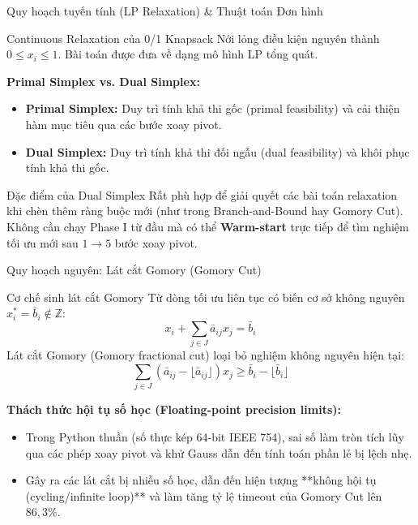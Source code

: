 \documentclass[10pt]{beamer}
\begin{document}
\begin{frame}{Quy hoạch tuyến tính (LP Relaxation) \& Thuật toán Đơn hình}
    \begin{block}{Continuous Relaxation của 0/1 Knapsack}
        Nới lỏng điều kiện nguyên thành $0 \le x_i \le 1$. Bài toán được đưa về dạng mô hình LP tổng quát.
    \end{block}
    \vspace{0.3em}
    \textbf{Primal Simplex vs. Dual Simplex:}
    \begin{itemize}
        \item \textbf{Primal Simplex:} Duy trì tính khả thi gốc (primal feasibility) và cải thiện hàm mục tiêu qua các bước xoay pivot.
        \item \textbf{Dual Simplex:} Duy trì tính khả thi đối ngẫu (dual feasibility) và khôi phục tính khả thi gốc.
    \end{itemize}
    \begin{alertblock}{Đặc điểm của Dual Simplex}
        Rất phù hợp để giải quyết các bài toán relaxation khi chèn thêm ràng buộc mới (như trong Branch-and-Bound hay Gomory Cut). Không cần chạy Phase I từ đầu mà có thể \textbf{Warm-start} trực tiếp để tìm nghiệm tối ưu mới sau $1 \rightarrow 5$ bước xoay pivot.
    \end{alertblock}
\end{frame}

\begin{frame}{Quy hoạch nguyên: Lát cắt Gomory (Gomory Cut)}
    \begin{block}{Cơ chế sinh lát cắt Gomory}
        Từ dòng tối ưu liên tục có biến cơ sở không nguyên $x_i^* = \bar{b}_i \notin \mathbb{Z}$:
        $$x_i + \sum_{j \in J} \bar{a}_{ij} x_j = \bar{b}_i$$
        Lát cắt Gomory (Gomory fractional cut) loại bỏ nghiệm không nguyên hiện tại:
        $$\sum_{j \in J} (\bar{a}_{ij} - \lfloor \bar{a}_{ij} \rfloor) x_j \ge \bar{b}_i - \lfloor \bar{b}_i \rfloor$$
    \end{block}
    \textbf{Thách thức hội tụ số học (Floating-point precision limits):}
    \begin{itemize}
        \item Trong Python thuần (số thực kép 64-bit IEEE 754), sai số làm tròn tích lũy qua các phép xoay pivot và khử Gauss dẫn đến tính toán phần lẻ bị lệch nhẹ.
        \item Gây ra các lát cắt bị nhiễu số học, dẫn đến hiện tượng **không hội tụ (cycling/infinite loop)** và làm tăng tỷ lệ timeout của Gomory Cut lên $86,3\%$.
    \end{itemize}
\end{frame}
\end{document}
